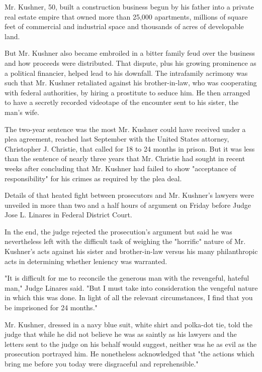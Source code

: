 Mr. Kushner, 50, built a construction business begun by his father into
a private real estate empire that owned more than 25,000 apartments,
millions of square feet of commercial and industrial space and thousands
of acres of developable land.

But Mr. Kushner also became embroiled in a bitter family feud over the
business and how proceeds were distributed. That dispute, plus his
growing prominence as a political financier, helped lead to his
downfall. The intrafamily acrimony was such that Mr. Kushner retaliated
against his brother-in-law, who was cooperating with federal
authorities, by hiring a prostitute to seduce him. He then arranged to
have a secretly recorded videotape of the encounter sent to his sister,
the man's wife.

The two-year sentence was the most Mr. Kushner could have received under
a plea agreement, reached last September with the United States
attorney, Christopher J. Christie, that called for 18 to 24 months in
prison. But it was less than the sentence of nearly three years that Mr.
Christie had sought in recent weeks after concluding that Mr. Kushner
had failed to show "acceptance of responsibility" for his crimes as
required by the plea deal.

Details of that heated fight between prosecutors and Mr. Kushner's
lawyers were unveiled in more than two and a half hours of argument on
Friday before Judge Jose L. Linares in Federal District Court.

In the end, the judge rejected the prosecution's argument but said he
was nevertheless left with the difficult task of weighing the "horrific"
nature of Mr. Kushner's acts against his sister and brother-in-law
versus his many philanthropic acts in determining whether leniency was
warranted.

"It is difficult for me to reconcile the generous man with the
revengeful, hateful man," Judge Linares said. "But I must take into
consideration the vengeful nature in which this was done. In light of
all the relevant circumstances, I find that you be imprisoned for 24
months."

Mr. Kushner, dressed in a navy blue suit, white shirt and polka-dot tie,
told the judge that while he did not believe he was as saintly as his
lawyers and the letters sent to the judge on his behalf would suggest,
neither was he as evil as the prosecution portrayed him. He nonetheless
acknowledged that "the actions which bring me before you today were
disgraceful and reprehensible."

